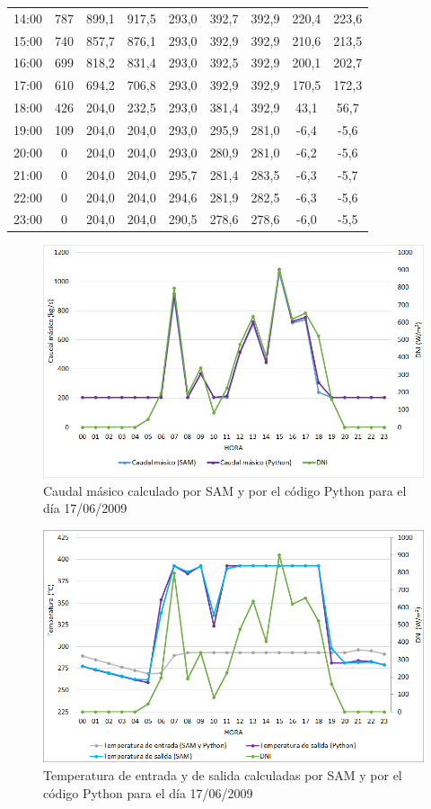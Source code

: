 \begin{table}[!h]
{\begin{tabular}{ccccccccc}
14:00 & 787 & 899,1 & 917,5 & 293,0 & 392,7 & 392,9 & 220,4 & 223,6 \\
15:00 & 740 & 857,7 & 876,1 & 293,0 & 392,9 & 392,9 & 210,6 & 213,5 \\
16:00 & 699 & 818,2 & 831,4 & 293,0 & 392,5 & 392,9 & 200,1 & 202,7 \\
17:00 & 610 & 694,2 & 706,8 & 293,0 & 392,9 & 392,9 & 170,5 & 172,3 \\
18:00 & 426 & 204,0 & 232,5 & 293,0 & 381,4 & 392,9 & 43,1  & 56,7  \\
19:00 & 109 & 204,0 & 204,0 & 293,0 & 295,9 & 281,0 & -6,4  & -5,6  \\
20:00 & 0   & 204,0 & 204,0 & 293,0 & 280,9 & 281,0 & -6,2  & -5,6  \\
21:00 & 0   & 204,0 & 204,0 & 295,7 & 281,4 & 283,5 & -6,3  & -5,7  \\
22:00 & 0   & 204,0 & 204,0 & 294,6 & 281,9 & 282,5 & -6,3  & -5,6  \\
23:00 & 0   & 204,0 & 204,0 & 290,5 & 278,6 & 278,6 & -6,0  & -5,5 
\end{tabular}%
}
\end{table}

\begin{figure}[!h]
\includegraphics[width=0.9\linewidth]{images/176caudal.png}
\caption{Caudal másico calculado por SAM y por el código Python para el día 17/06/2009} 
\label{fig:176caudal}
\end{figure}

\begin{figure}[!h]
\includegraphics[width=0.9\linewidth]{images/176temperatura.png}
\caption{Temperatura de entrada y de salida calculadas por SAM y por el código Python para el día 17/06/2009} 
\label{fig:176temperatura}
\end{figure}

